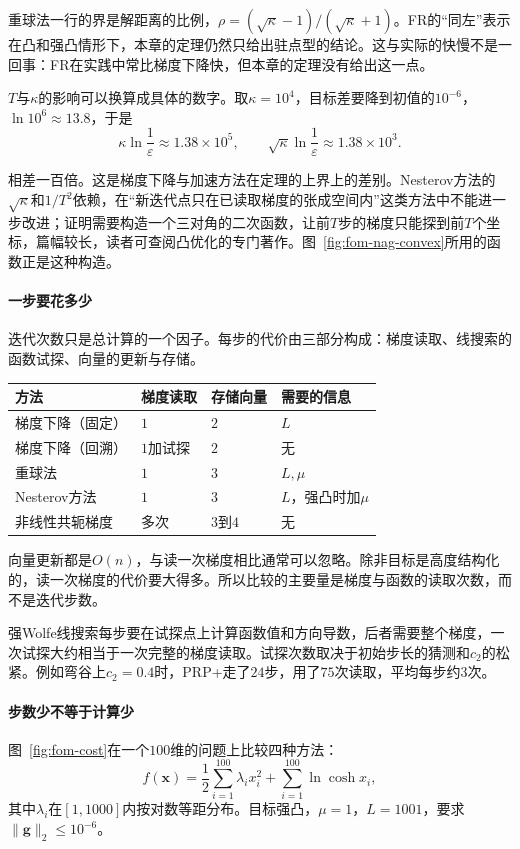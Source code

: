 重球法一行的界是解距离的比例，$\rho=(\sqrt\kappa-1)/(\sqrt\kappa+1)$。FR的“同左”表示在凸和强凸情形下，本章的定理仍然只给出驻点型的结论。这与实际的快慢不是一回事：FR在实践中常比梯度下降快，但本章的定理没有给出这一点。

$T$与$\kappa$的影响可以换算成具体的数字。取$\kappa=10^4$，目标差要降到初值的$10^{-6}$，$\ln10^6\approx13.8$，于是
\[
 \kappa\ln\frac1\varepsilon\approx1.38\times10^5,\qquad
 \sqrt\kappa\ln\frac1\varepsilon\approx1.38\times10^3.
\]

相差一百倍。这是梯度下降与加速方法在定理的上界上的差别。Nesterov方法的$\sqrt\kappa$和$1/T^2$依赖，在“新迭代点只在已读取梯度的张成空间内”这类方法中不能进一步改进；证明需要构造一个三对角的二次函数，让前$T$步的梯度只能探到前$T$个坐标，篇幅较长，读者可查阅凸优化的专门著作。图~\ref{fig:fom-nag-convex}所用的函数正是这种构造。

\paragraph{一步要花多少}
迭代次数只是总计算的一个因子。每步的代价由三部分构成：梯度读取、线搜索的函数试探、向量的更新与存储。

\begin{BookInlineTable}
  \centering
  \caption{每步的代价，维数为$n$。}
  \label{tab:fom-cost-per-step}
  \begin{tabular}{llll}
   \toprule
   方法 & 梯度读取 & 存储向量 & 需要的信息\\
   \midrule
   梯度下降（固定） & $1$ & $2$ & $L$\\
   梯度下降（回溯） & $1$加试探 & $2$ & 无\\
   重球法 & $1$ & $3$ & $L,\mu$\\
   Nesterov方法 & $1$ & $3$ & $L$，强凸时加$\mu$\\
   非线性共轭梯度 & 多次 & $3$到$4$ & 无\\
   \bottomrule
  \end{tabular}
\end{BookInlineTable}

向量更新都是$O(n)$，与读一次梯度相比通常可以忽略。除非目标是高度结构化的，读一次梯度的代价要大得多。所以比较的主要量是梯度与函数的读取次数，而不是迭代步数。

强Wolfe线搜索每步要在试探点上计算函数值和方向导数，后者需要整个梯度，一次试探大约相当于一次完整的梯度读取。试探次数取决于初始步长的猜测和$c_2$的松紧。例如弯谷上$c_2=0.4$时，PRP+走了$24$步，用了$75$次读取，平均每步约$3$次。

\paragraph{步数少不等于计算少}
图~\ref{fig:fom-cost}在一个$100$维的问题上比较四种方法：
\[
 f(\bm{x})=\frac12\sum_{i=1}^{100}\lambda_ix_i^2+\sum_{i=1}^{100}\ln\cosh x_i,
\]
其中$\lambda_i$在$[1,1000]$内按对数等距分布。目标强凸，$\mu=1$，$L=1001$，要求$\lVert\bm{g}\rVert_2\leq10^{-6}$。


